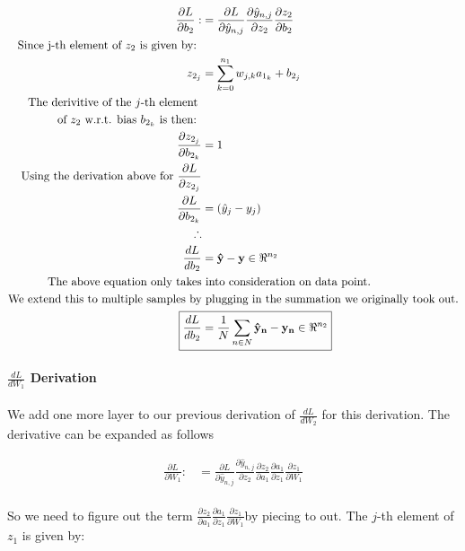 \documentclass[]{article}
\begin{document}
\begin{align*}
\frac{\partial L}{\partial b_2} : &=  \frac{\partial L }{\partial  \hat{y}_{n,j} } \frac{\partial  \hat{y}_{n,j} }{\partial z_2} \frac{\partial z_2}{\partial b_2}\\
\text{Since j-th element of $z_2$ is given by: } \\
z_{2_j} &= \sum_{k = 0}^{n_1}w_{j,k}a_{1_k} + b_{2_j}\\ 
\text{The derivitive of the $j$-th element }\\
\text{of $z_2$ w.r.t. bias $b_{2_k}$ is then: }\\
\frac{\partial z_{2_j}}{\partial b_{2_k}} &= 1\\
\text{Using the derivation above for  $\frac{\partial L}{\partial z_{2_j}}$}\\
\frac{\partial L}{\partial b_{2_k}} &=  (\hat{y}_j - y_j )\\
\therefore \\
\frac{dL}{db_2} &= \mathbf{\hat{y} - y}\in  \Re^{n_2} \\
\text{The above equation only takes} & \text{ into consideration on data point.} \\
\text{We extend this to multiple samples by} & \text{ plugging in the summation we originally took out.}\\
\Aboxed{ \frac{dL}{db_2} &= \frac{1}{N} \sum_{n \in N}  \mathbf{\hat{y}_n - y_n}\in  \Re^{n_2}}\\
\end{align*}

\paragraph{$\frac{dL}{dW_1}$ Derivation}
We add one more layer to our previous derivation of $\frac{dL}{dW_2}$ for this derivation. The derivative can be expanded as follows

\begin{align*}
\frac{\partial L}{\partial W_1} : &=  \frac{\partial L }{\partial  \hat{y}_{n,j} } \frac{\partial  \hat{y}_{n,j} }{\partial z_2} \frac{\partial z_2}{\partial a_1}\frac{\partial a_1}{\partial z_1} \frac{\partial z_1}{\partial W_1}  \\
\end{align*}

So we need to figure out the term $\frac{\partial z_2}{\partial a_1}\frac{\partial a_1}{\partial z_1} \frac{\partial z_1}{\partial W_1} $by piecing to out. The $j$-th element of $z_1$ is given by:
\end{document}
